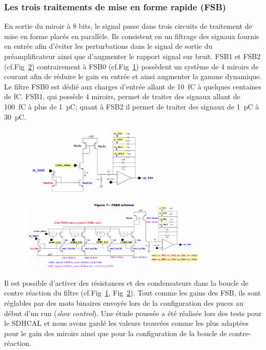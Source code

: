 \subsubsection{Les trois traitements de mise en forme rapide (FSB)}
En sortie du miroir à \num{8} bits, le signal passe dans trois circuits de traitement de mise en forme placés en parallèle. Ils consistent en un filtrage des signaux fournis en entrée afin d'éviter les perturbations dans le signal de sortie du préamplificateur ainsi que d'augmenter le rapport signal sur bruit. FSB1 et FSB2 (cf.Fig~\ref{fsb1}) contrairement à FSB0 (cf.Fig~\ref{fsb0}) possèdent un système de \num{4} miroirs de courant afin de réduire le gain en entrée et ainsi augmenter la gamme dynamique. Le filtre FSB0 est dédié aux charges d'entrée allant de \SI{10}{\femto\coulomb} à quelques centaines de \si{\femto\coulomb}. FSB1, qui possède \num{4} miroirs, permet de traiter des signaux allant de \SI{100}{\femto\coulomb} à plus de \SI{1}{\pico\coulomb}; quant à FSB2 il permet de traiter des signaux de \SI{1}{\pico\coulomb} à \SI{30}{\pico\coulomb}.

\begin{figure}[ht!]
	\centering
	\includegraphics[width=0.60\textwidth]{GLA/FSB0.png}
	\label{fsb0}
\end{figure}

\begin{figure}[ht!]
	\centering
	\includegraphics[width=0.8\textwidth]{GLA/FSB1.png}
	\label{fsb1}
\end{figure}

Il est possible d'activer des résistances et des condensateurs dans la boucle de contre réaction du filtre (cf.Fig~\ref{fsb0}, Fig~\ref{fsb1}). Tout comme les gains des FSB, ils sont réglables par des mots binaires envoyés lors de la configuration des puces au début d'un run (\textit{slow control}). Une étude poussée a été réalisée lors des tests pour le SDHCAL et nous avons gardé les valeurs trouvées comme les plus adaptées pour le gain des miroirs ainsi que pour la configuration de la boucle de contre-réaction.


